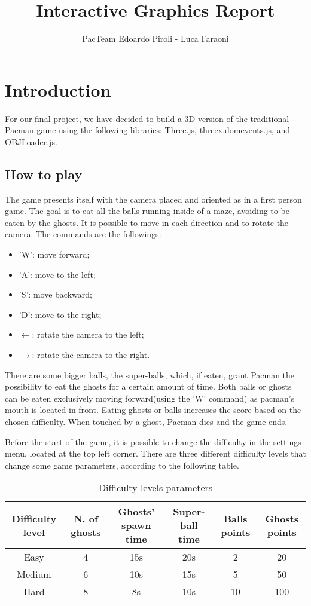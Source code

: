 \documentclass[a4paper,oneside]{report}
\title{Interactive Graphics Report}
\author{PacTeam \cr Edoardo Piroli - Luca Faraoni}
\begin{document}
\maketitle
\tableofcontents

\chapter{Introduction}

For our final project, we have decided to build a 3D version of the traditional Pacman game using the following libraries: Three.js, threex.domevents.js, and OBJLoader.js. 

\section{How to play}
The game presents itself with the camera placed and oriented as in a first person game. The goal is to eat all the balls running inside of a maze, avoiding to be eaten by the ghosts. It is possible to move in each direction and to rotate the camera. The commands are the followings:
\begin{itemize}
\item 'W': move forward;
\item 'A': move to the left;
\item 'S': move backward;
\item 'D': move to the right;
\item $\leftarrow$: rotate the camera to the left;
\item $\rightarrow$: rotate the camera to the right.
\end{itemize}

There are some bigger balls, the super-balls, which, if eaten, grant Pacman the possibility to eat the ghosts for a certain amount of time. Both balls or ghosts can be eaten exclusively moving forward(using the 'W' command) as pacman's mouth is located in front. Eating ghosts or balls increases the score based on the chosen difficulty. When touched by a ghost, Pacman dies and the game ends.

Before the start of the game, it is possible to change the difficulty in the settings menu, located at the top left corner. There are three different difficulty levels that change some game parameters, according to the following table.
\begin{table}[H]
\caption{Difficulty levels parameters}
\begin{center}
\begin{tabular}{|c|c|c|c|c|c|}
\hline
\textbf{Difficulty level} & \textbf{N. of ghosts} & \textbf{Ghosts' spawn time} & \textbf{Super-ball time} & \textbf{Balls points} & \textbf{Ghosts points} \\
\hline
Easy & 4 & 15s & 20s & 2 & 20 \\
\hline
Medium & 6 & 10s & 15s & 5 & 50 \\
\hline
Hard & 8 & 8s & 10s & 10 & 100 \\
\hline
\end{tabular}
\end{center}
\end{table}
\end{document}
